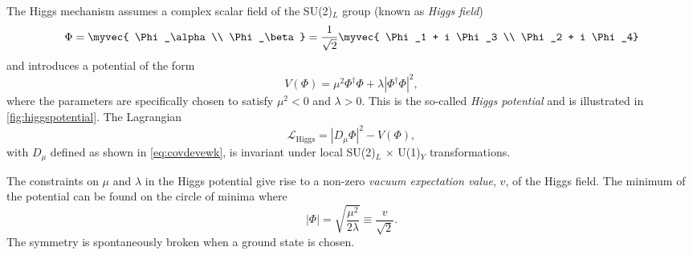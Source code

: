 
The Higgs mechanism assumes a complex scalar field of the SU(2)$_L$ group (known as \emph{Higgs field})
\begin{equation}
  \Phi = \myvec{ \Phi_\alpha \\ \Phi_\beta } = \frac{1}{\sqrt{2}} \myvec { \Phi_1 + i \Phi_3 \\ \Phi_2 + i \Phi_4}
\end{equation}
and introduces a potential of the form
\begin{equation}
  V(\Phi) = \mu^2\Phi^\dagger\Phi + \lambda \left| \Phi^\dagger\Phi \right|^2, 
  \label{eq:higgspotential}
\end{equation}
where the parameters are specifically chosen to satisfy $\mu^2 < 0$ and $\lambda > 0$.
This is the so-called \emph{Higgs potential} and is illustrated in \cref{fig:higgspotential}.
The Lagrangian 
\begin{equation}
  \mathcal{L}_{\text{Higgs}} = |D_\mu\Phi|^2 - V(\Phi), %
  \label{eq:lagrangianhiggs}
\end{equation}
with $D_\mu$ defined as shown in \cref{eq:covdevewk}, is invariant under local SU(2)$_L$ $\times$ U(1)$_Y$ transformations.

The constraints on $\mu$ and $\lambda$ in the Higgs potential give rise to a non-zero \emph{vacuum expectation value}, $v$, of the Higgs field.
The minimum of the potential can be found on the circle of minima where
\begin{equation}
  |\Phi| = \sqrt{ \frac{\mu^2}{2\lambda} } \equiv \frac{ v }{\sqrt{2}}.
  \label{eq:higgsminima}
\end{equation}
The symmetry is spontaneously broken when a ground state is chosen. 

